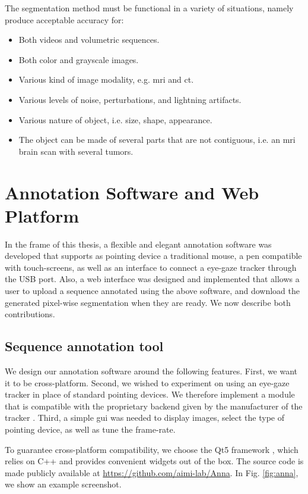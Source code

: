 The segmentation method must be functional in a variety of situations, namely produce acceptable accuracy for:
\begin{itemize}
  \item Both videos and volumetric sequences.
  \item Both color and grayscale images.
  \item Various kind of image modality, e.g. \gls{mri} and \gls{ct}.
  \item Various levels of noise, perturbations, and lightning artifacts.
  \item Various nature of object, i.e. size, shape, appearance.
  \item The object can be made of several parts that are not contiguous, i.e. an \gls{mri} brain scan with several tumors.
\end{itemize}

\section{Annotation Software and Web Platform}
In the frame of this thesis, a flexible and elegant annotation software was developed that supports as pointing device a traditional mouse, a pen compatible with touch-screens, as well as an interface to connect a eye-gaze tracker through the USB port.
Also, a web interface was designed and implemented that allows a user to upload a sequence annotated using the above software, and download the generated pixel-wise segmentation when they are ready.
We now describe both contributions.

\subsection{Sequence annotation tool}
\label{sec:anna}

We design our annotation software around the following features.
First, we want it to be cross-platform.
Second, we wished to experiment on using an eye-gaze tracker in place of standard pointing devices.
We therefore implement a module that is compatible with the proprietary backend given by the manufacturer of the tracker \cite{eyetribe}.
Third, a simple \gls{gui} was needed to display images, select the type of pointing device, as well as tune the frame-rate.

To guarantee cross-platform compatibility, we choose the Qt5 framework \cite{eng16}, which relies on C++ and provides convenient widgets out of the box.
The source code is made publicly available at \url{https://github.com/aimi-lab/Anna}.
In Fig. \ref{fig:anna}, we show an example screenshot.


